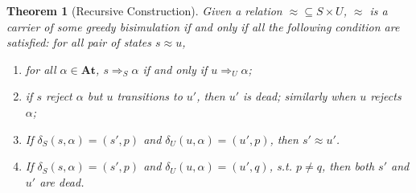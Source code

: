 \documentclass[conference]{IEEEtran}
\newtheorem{theorem}{Theorem}
\newcommand{\At}{\mathbf{At}}
\newcommand{\transAcc}[2]{⇒_{#1} #2}
\begin{document}
\begin{theorem}[Recursive Construction]\label{thm:recursive-construction}
    Given a relation \({≈} ⊆ S × U\), \(≈\) is a carrier of some greedy bisimulation if and only if all the following condition are satisfied: for all pair of states \(s ≈ u\),
    \begin{enumerate}
        \item\label{itm:acc-condition} for all \(α ∈ \At\), 
        \(s \transAcc{S}{α}\) if and only if \(u \transAcc{U}{α}\);
        \item\label{itm:rej-or-dead} if \(s\) reject \(α\) but \(u\) transitions to \(u'\), then \(u'\) is dead; similarly when \(u\) rejects \(α\);  
        \item\label{itm:transition-bisim} If \(δ_{S}(s, α) = (s', p)\) and \(δ_{U}(u, α) = (u', p)\), then \(s' ≈ u'\).
        \item\label{itm:transition-dead} If \(δ_{S}(s, α) = (s', p)\) and \(δ_{U}(u, α) = (u', q)\), s.t. \(p ≠ q\), then both \(s'\) and \(u'\) are dead.
    \end{enumerate}
\end{theorem}
\end{document}
